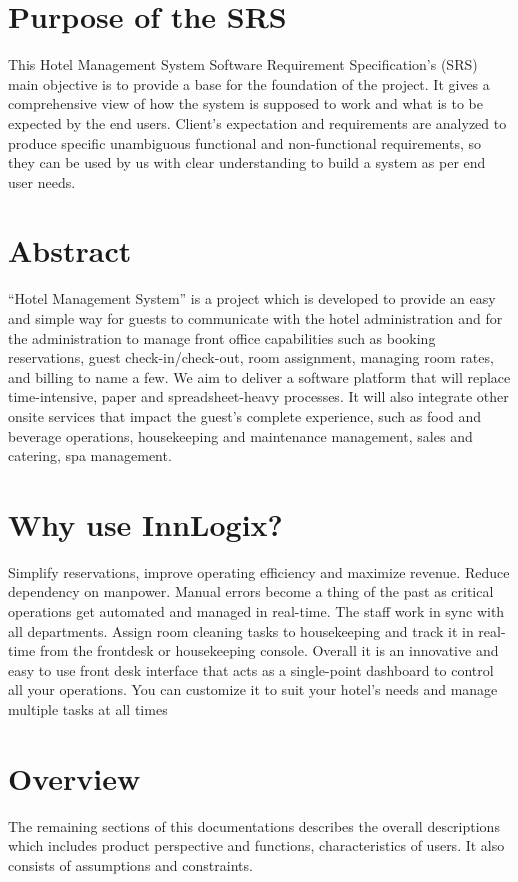 \documentclass{scrreprt}
\begin{document}
\section{Purpose of the SRS}
This Hotel Management System Software Requirement Specification's (SRS) main objective is to provide a base for the foundation of the project. It gives a comprehensive view of how the system is supposed to work and what is to be expected by the end users. Client’s expectation and requirements are analyzed to produce specific unambiguous functional and non-functional requirements, so they can be used by us with clear understanding to build a system as per end user needs.

\section{Abstract}
“Hotel Management System” is a project which is developed to provide an easy and simple way for guests to communicate with the hotel administration and for the administration to manage front office capabilities such as booking reservations, guest check-in/check-out, room assignment, managing room rates, and billing to name a few. We aim to deliver a software platform that will replace time-intensive, paper and spreadsheet-heavy processes. It will also integrate other onsite services that impact the guest's complete experience, such as food and beverage operations, housekeeping and maintenance management, sales and catering, spa management.

\section{Why use InnLogix?}
Simplify reservations, improve operating efficiency and maximize revenue. 
Reduce dependency on manpower. Manual errors become a thing of the past as critical operations get automated and managed in real-time. The staff work in sync with all departments. Assign room cleaning tasks to housekeeping and track it in real-time from the frontdesk or housekeeping console. Overall it is an innovative and easy to use front desk interface that acts as a single-point dashboard to control all your operations. You can customize it to suit your hotel’s needs and manage multiple tasks at all times


\section{Overview}
The remaining sections of this documentations describes the overall descriptions which includes product perspective and functions, characteristics of users. It also consists of assumptions and constraints.
\end{document}
